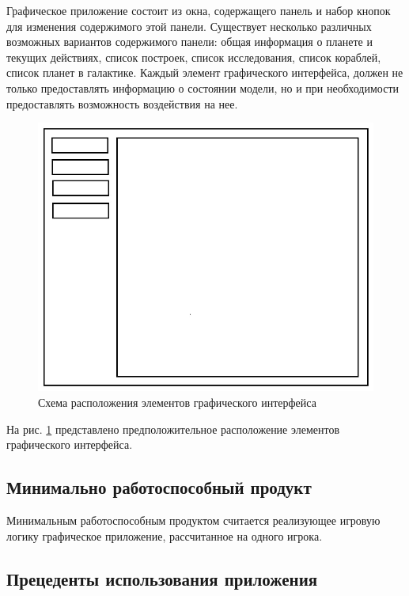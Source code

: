 Графическое приложение состоит из окна, содержащего панель и набор кнопок для изменения содержимого этой панели. Существует несколько различных возможных вариантов содержимого панели: общая информация о планете и текущих действиях, список построек, список исследования, список кораблей, список планет в галактике. Каждый элемент графического интерфейса, должен не только предоставлять информацию о состоянии модели, но и при необходимости предоставлять возможность воздействия на нее.

\begin{figure}[H]
\centering
\includegraphics[scale=0.5]{sc.jpg}
\caption{Схема расположения элементов графического интерфейса}
\label{sc}
\end{figure}

На рис. \ref{sc} представлено предположительное расположение элементов графического интерфейса.

\subsection{Минимально работоспособный продукт}
Минимальным работоспособным продуктом считается реализующее игровую логику графическое приложение, рассчитанное на одного игрока.

\subsection{Прецеденты использования приложения}


